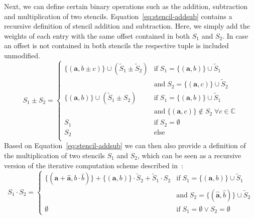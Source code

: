 Next, we can define certain binary operations such as the addition, subtraction and multiplication of two stencils.
Equation~\eqref{eq:stencil-addsub} contains a recursive definition of stencil addition and subtraction.
Here, we simply add the weights of each entry with the same offset contained in both $S_1$ and $S_2$.
In case an offset is not contained in both stencils the respective tuple is included unmodified.  
\begin{equation}
	S_1 \pm S_2 = 
	\begin{cases}
		\{(\bm{a}, b\pm c ) \} \cup (\tilde{S}_1 \pm \tilde{S}_2) & \text{if} \; S_1 = 	\{(\bm{a}, b ) \} \cup \tilde{S}_1 \\
		& \text{and} \; S_2 = \{(\bm{a}, c ) \} \cup \tilde{S}_2 \\
		
		\{(\bm{a}, b ) \} \cup (\tilde{S}_1 \pm S_2) & \text{if} \; S_1 = 	\{(\bm{a}, b ) \} \cup \tilde{S}_1 \\
		& \text{and} \; \{(\bm{a}, c ) \} \notin S_2 \;
		\forall c \in \mathbb{C}
		\\
		S_1 & \text{if} \; S_2 = \emptyset
		\\
		S_2 & \text{else} 
		\\
	\end{cases}
\label{eq:stencil-addsub}
\end{equation}
Based on Equation~\eqref{eq:stencil-addsub} we can then also provide a definition of the multiplication of two stencils $S_1$ and $S_2$, which can be seen as a recursive version of the iterative computation scheme described in~\cite{rittich2018extending}:
\begin{equation}
	S_1 \cdot S_2 = 
	\begin{cases}
		\{(\bm{a} + \bm{\hat{a}}, b \cdot \hat{b} ) \} +  \{(\bm{a}, b ) \} \cdot \tilde{S}_2 + \tilde{S}_1 \cdot S_2 & \text{if} \; S_1 = \{(\bm{a}, b ) \} \cup \tilde{S}_1 \\
		&
		\text{and} \; S_2 = \{(\bm{\hat{a}}, \hat{b} ) \} \cup \tilde{S}_2 \\
		\emptyset & \text{if} \; S_1 = \emptyset \vee S_2 = \emptyset
	\end{cases}
\label{eq:stencil-mult}
\end{equation}
